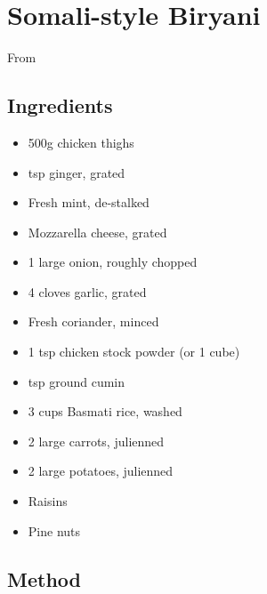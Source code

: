 \section{Somali-style Biryani}


From 

\subsection{Ingredients}

\begin{itemize}
    \item 500g chicken thighs
    \item {} tsp ginger, grated
    \item Fresh mint, de-stalked
    \item Mozzarella cheese, grated
    \item 1 large onion, roughly chopped
    \item 4 cloves garlic, grated
    \item Fresh coriander, minced
    \item 1 tsp chicken stock powder (or 1 cube)
    \item {} tsp ground cumin
    \item 3 cups Basmati rice, washed
    \item 2 large carrots, julienned
    \item 2 large potatoes, julienned
    \item Raisins
    \item Pine nuts
\end{itemize}

\subsection{Method}

